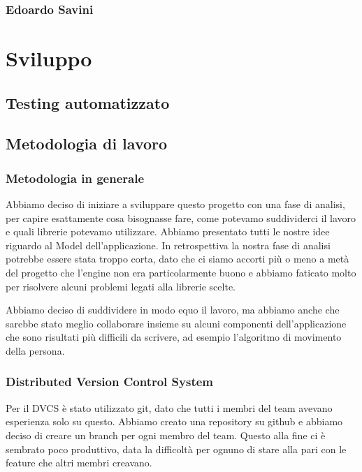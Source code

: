 \subsection{Edoardo Savini}

\chapter{Sviluppo}

\section{Testing automatizzato}


\section{Metodologia di lavoro}

\subsection{Metodologia in generale}

Abbiamo deciso di iniziare a sviluppare questo progetto con una fase di analisi, per capire esattamente cosa bisognasse fare, come potevamo suddividerci il lavoro e quali librerie potevamo utilizzare. Abbiamo presentato tutti le nostre idee riguardo al Model dell'applicazione. In retrospettiva la nostra fase di analisi potrebbe essere stata troppo corta, dato che ci siamo accorti più o meno a metà del progetto che l'engine non era particolarmente buono e abbiamo faticato molto per risolvere alcuni problemi legati alla librerie scelte.

Abbiamo deciso di suddividere in modo equo il lavoro, ma abbiamo anche che sarebbe stato meglio collaborare insieme su alcuni componenti dell'applicazione che sono risultati più difficili da scrivere, ad esempio l'algoritmo di movimento della persona.

\subsection{Distributed Version Control System}
Per il DVCS è stato utilizzato git, dato che tutti i membri del team avevano esperienza solo su questo. Abbiamo creato una repository su github e abbiamo deciso di creare un branch per ogni membro del team. Questo alla fine ci è sembrato poco produttivo, data la difficoltà per ognuno di stare alla pari con le feature che altri membri creavano.

